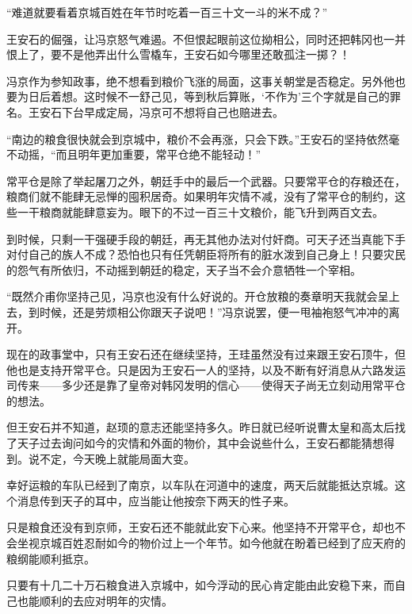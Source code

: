 “难道就要看着京城百姓在年节时吃着一百三十文一斗的米不成？”

王安石的倔强，让冯京怒气难遏。不但恨起眼前这位拗相公，同时还把韩冈也一并恨上了，要不是他弄出什么雪橇车，王安石如今哪里还敢孤注一掷？！

冯京作为参知政事，绝不想看到粮价飞涨的局面，这事关朝堂是否稳定。另外他也要为日后着想。这时候不一舒己见，等到秋后算账，‘不作为’三个字就是自己的罪名。王安石下台早成定局，冯京可不想将自己也赔进去。

“南边的粮食很快就会到京城中，粮价不会再涨，只会下跌。”王安石的坚持依然毫不动摇，“而且明年更加重要，常平仓绝不能轻动！”

常平仓是除了举起屠刀之外，朝廷手中的最后一个武器。只要常平仓的存粮还在，粮商们就不能肆无忌惮的囤积居奇。如果明年灾情不减，没有了常平仓的制约，这些一干粮商就能肆意妄为。眼下的不过一百三十文粮价，能飞升到两百文去。

到时候，只剩一干强硬手段的朝廷，再无其他办法对付奸商。可天子还当真能下手对付自己的族人不成？恐怕也只有任凭朝臣将所有的脏水泼到自己身上！只要灾民的怨气有所依归，不动摇到朝廷的稳定，天子当不会介意牺牲一个宰相。

“既然介甫你坚持己见，冯京也没有什么好说的。开仓放粮的奏章明天我就会呈上去，到时候，还是劳烦相公你跟天子说吧！”冯京说罢，便一甩袖袍怒气冲冲的离开。

现在的政事堂中，只有王安石还在继续坚持，王珪虽然没有过来跟王安石顶牛，但他也是支持开常平仓。只是因为王安石一人的坚持，以及不断有好消息从六路发运司传来——多少还是靠了皇帝对韩冈发明的信心——使得天子尚无立刻动用常平仓的想法。

但王安石并不知道，赵顼的意志还能坚持多久。昨日就已经听说曹太皇和高太后找了天子过去询问如今的灾情和外面的物价，其中会说些什么，王安石都能猜想得到。说不定，今天晚上就能局面大变。

幸好运粮的车队已经到了南京，以车队在河道中的速度，两天后就能抵达京城。这个消息传到天子的耳中，应当能让他按奈下两天的性子来。

只是粮食还没有到京师，王安石还不能就此安下心来。他坚持不开常平仓，却也不会坐视京城百姓忍耐如今的物价过上一个年节。如今他就在盼着已经到了应天府的粮纲能顺利抵京。

只要有十几二十万石粮食进入京城中，如今浮动的民心肯定能由此安稳下来，而自己也能顺利的去应对明年的灾情。


